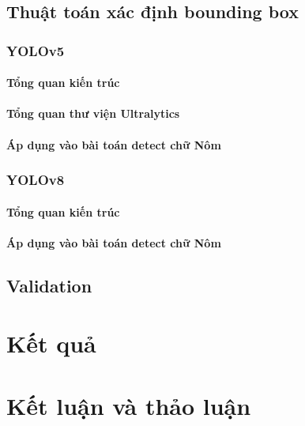 \documentclass[a4paper,12pt]{article}
\begin{document}
\subsection{Thuật toán xác định bounding box}
\subsubsection{YOLOv5}
\paragraph{Tổng quan kiến trúc}
\paragraph{Tổng quan thư viện Ultralytics}
\paragraph{Áp dụng vào bài toán detect chữ Nôm}
\subsubsection{YOLOv8}
\paragraph{Tổng quan kiến trúc}
\paragraph{Áp dụng vào bài toán detect chữ Nôm}
\subsection{Validation}
\section{Kết quả}
\section{Kết luận và thảo luận}
\end{document}
